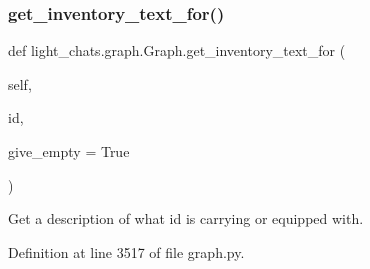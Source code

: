 \subsubsection{\texorpdfstring{get\+\_\+inventory\+\_\+text\+\_\+for()}{get\_inventory\_text\_for()}}
{\footnotesize\ttfamily def light\+\_\+chats.\+graph.\+Graph.\+get\+\_\+inventory\+\_\+text\+\_\+for (\begin{DoxyParamCaption}\item[{}]{self,  }\item[{}]{id,  }\item[{}]{give\+\_\+empty = {\ttfamily True} }\end{DoxyParamCaption})}

\begin{DoxyVerb}Get a description of what id is carrying or equipped with.
\end{DoxyVerb}
 

Definition at line 3517 of file graph.\+py.


